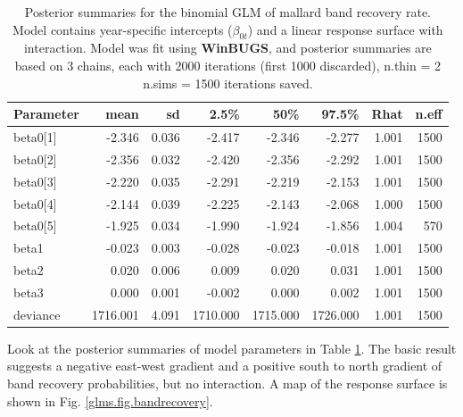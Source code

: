 \begin{table}
\caption{Posterior summaries for the binomial GLM of mallard band
  recovery rate.  Model contains year-specific intercepts
  ($\beta_{0t}$) and a linear response surface with interaction. 
Model was fit using {\bf WinBUGS}, and posterior summaries are based 
on 3 chains, each with 2000 iterations (first 1000 discarded), n.thin = 2
 n.sims = 1500 iterations saved.
   }
  \begin{tabular}{lrrrrrrr}
    \hline
        \hline
 Parameter &    mean   & sd   &  2.5\%   &    50\%   &   97.5\% & Rhat & n.eff \\
     \hline
beta0[1] &  -2.346& 0.036&   -2.417&   -2.346&   -2.277& 1.001&  1500\\
beta0[2] &  -2.356& 0.032&   -2.420&   -2.356&   -2.292& 1.001&  1500\\
beta0[3] &  -2.220& 0.035&   -2.291&   -2.219&   -2.153& 1.001&  1500\\
beta0[4] &  -2.144& 0.039&   -2.225&   -2.143&   -2.068& 1.000&  1500\\
beta0[5] &  -1.925& 0.034&   -1.990&   -1.924&   -1.856& 1.004&   570\\
beta1    &  -0.023& 0.003&   -0.028&   -0.023&   -0.018& 1.001&  1500\\
beta2    &   0.020& 0.006&    0.009&    0.020&    0.031& 1.001&  1500\\
beta3    &   0.000& 0.001&   -0.002&    0.000&    0.002& 1.001&  1500\\
deviance &1716.001& 4.091& 1710.000&  1715.000&  1726.000& 1.001&  1500\\
    \hline
  \end{tabular}
  \label{glms.tab.mallard}
\vspace{0.5cm}
\end{table}



Look at the posterior summaries of model parameters in Table
\ref{glms.tab.mallard}. The basic result suggests a negative east-west
gradient and a positive south to north gradient of band recovery
probabilities, but no interaction. A map of the response surface is
shown in Fig. \ref{glms.fig.bandrecovery}.


